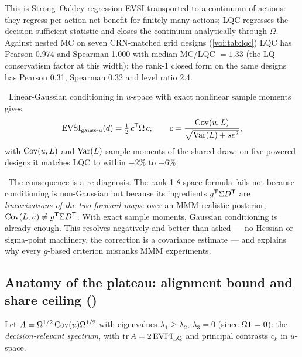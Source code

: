 This is Strong--Oakley regression EVSI transported to a continuum of actions: they regress per-action net benefit for finitely many actions; LQC regresses the decision-sufficient statistic and closes the continuum analytically through $\Omega$. Against nested MC on seven CRN-matched grid designs (\cref{voi:tab:lqc}) LQC has Pearson 0.974 and Spearman 1.000 with median MC/LQC $= 1.33$ (the LQ conservatism factor at this width); the rank-1 closed form on the same designs has Pearson 0.31, Spearman 0.32 and level ratio 2.4.

\begin{proposition}
\label{voi:prop:gaussu}
\tagEstablished\ Linear-Gaussian conditioning in $u$-space with exact nonlinear sample moments gives
\begin{equation}
\mathrm{EVSI}_{\mathrm{gauss}\text{-}u}(d) = \tfrac12\, c^{\mathsf{T}} \Omega\, c, \qquad c = \frac{\operatorname{Cov}(u, L)}{\sqrt{\operatorname{Var}(L) + se^2}},
\label{voi:eq:gaussu}
\end{equation}
with $\operatorname{Cov}(u,L)$ and $\operatorname{Var}(L)$ sample moments of the shared draw; on five powered designs it matches LQC to within $-2\%$ to $+6\%$.
\end{proposition}

\tagRefuted\ The consequence is a re-diagnosis. The rank-1 $\theta$-space formula fails not because conditioning is non-Gaussian but because its ingredients $g^{\mathsf{T}}\Sigma D^{\mathsf{T}}$ are \emph{linearizations of the two forward maps}: over an MMM-realistic posterior, $\operatorname{Cov}(L,u) \ne g^{\mathsf{T}}\Sigma D^{\mathsf{T}}$. With exact sample moments, Gaussian conditioning is already enough. This resolves  negatively and better than asked --- no Hessian or sigma-point machinery, the correction is a covariance estimate --- and explains why every $g$-based criterion misranks MMM experiments.

\subsection{Anatomy of the plateau: alignment bound and share ceiling ()}

Let $A = \Omega^{1/2}\operatorname{Cov}(u)\Omega^{1/2}$ with eigenvalues $\lambda_1 \ge \lambda_2$, $\lambda_3 = 0$ (since $\Omega\mathbf{1} = 0$): the \emph{decision-relevant spectrum}, with $\operatorname{tr} A = 2\,\mathrm{EVPI}_{\mathrm{LQ}}$ and principal contrasts $c_k$ in $u$-space.

